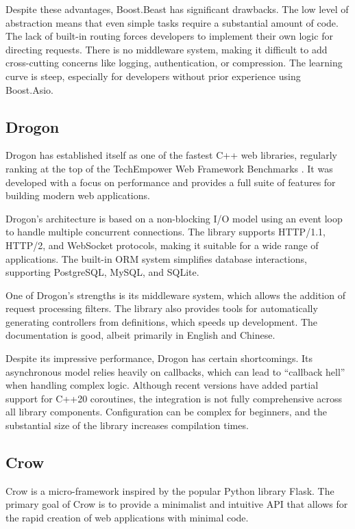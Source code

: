 Despite these advantages, Boost.Beast has significant drawbacks. The low level of abstraction means that even simple tasks require a substantial amount of code. The lack of built-in routing forces developers to implement their own logic for directing requests. There is no middleware system, making it difficult to add cross-cutting concerns like logging, authentication, or compression. The learning curve is steep, especially for developers without prior experience using Boost.Asio.

\subsection{Drogon}

Drogon \cite{drogon} has established itself as one of the fastest C++ web libraries, regularly ranking at the top of the TechEmpower Web Framework Benchmarks \cite{techempower}. It was developed with a focus on performance and provides a full suite of features for building modern web applications.

Drogon's architecture is based on a non-blocking I/O model using an event loop to handle multiple concurrent connections. The library supports HTTP/1.1, HTTP/2, and WebSocket protocols, making it suitable for a wide range of applications. The built-in ORM system simplifies database interactions, supporting PostgreSQL, MySQL, and SQLite.

One of Drogon's strengths is its middleware system, which allows the addition of request processing filters. The library also provides tools for automatically generating controllers from definitions, which speeds up development. The documentation is good, albeit primarily in English and Chinese.

Despite its impressive performance, Drogon has certain shortcomings. Its asynchronous model relies heavily on callbacks, which can lead to ``callback hell'' when handling complex logic. Although recent versions have added partial support for C++20 coroutines, the integration is not fully comprehensive across all library components. Configuration can be complex for beginners, and the substantial size of the library increases compilation times.

\subsection{Crow}

Crow \cite{crow} is a micro-framework inspired by the popular Python library Flask. The primary goal of Crow is to provide a minimalist and intuitive API that allows for the rapid creation of web applications with minimal code.

